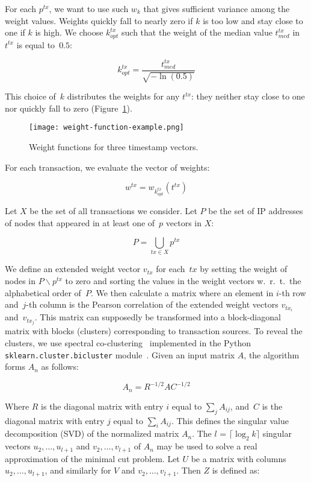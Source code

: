 For each $p^{tx}$, we want to use such $w_k$ that gives sufficient variance among the weight values.
Weights quickly fall to nearly zero if $k$ is too low and stay close to one if $k$ is high.
We choose $k^{tx}_{opt}$ such that the weight of the median value $t^{tx}_{med}$ in~$t^{tx}$ is equal to~$0.5$:

\[
k^{tx}_{opt} = \frac{t^{tx}_{med}}{\sqrt{-\ln(0.5)}}
\]

This choice of~$k$ distributes the weights for any $t^{tx}$: they neither stay close to one nor quickly fall to zero (Figure~\ref{fig:weight}).

\begin{figure}
	\centering
	\texttt{[image: weight-function-example.png]}
	\caption{Weight functions for three timestamp vectors.}
	\label{fig:weight}
\end{figure}
For each transaction, we evaluate the vector of weights:

\[
w^{tx} = w_{k^{tx}_{opt}}(t^{tx})
\]

Let $X$ be the set of all transactions we consider.
Let $P$ be the set of IP addresses of nodes that appeared in at least one of~$p$ vectors in $X$:

\[
P = \bigcup\limits_{tx \in X} p^{tx}
\]

We define an extended weight vector $v_{tx}$ for each~$tx$ by setting the weight of nodes in $P \backslash p^{tx}$ to zero and sorting the values in the weight vectors w.~r.~t.~the alphabetical order of~$P$.
We then calculate a matrix where an element in $i$-th row and~$j$-th column is the Pearson correlation of the extended weight vectors $v_{tx_i}$ and~$v_{tx_j}$.
This matrix can supposedly be transformed into a block-diagonal matrix with blocks (clusters) corresponding to transaction sources.
To reveal the clusters, we use spectral co-clustering~\cite{Dhillon2001} implemented in the Python \texttt{sklearn.cluster.bicluster} module~\cite{scikit-learn, scikitlearn2018}.
Given an input matrix $A$, the algorithm forms $A_n$ as follows:

\[
A_n = R^{-1/2}AC^{-1/2}
\]

Where $R$ is the diagonal matrix with entry $i$ equal to $\sum_{j} A_{ij}$, and~$C$ is the diagonal matrix with entry $j$ equal to $\sum_{i} A_{ij}$.
This defines the singular value decomposition (SVD) of the normalized matrix $A_n$.
The $l$ = $\lceil \log_2 k \rceil$ singular vectors $u_2,\dots,u_{l+1}$ and $v_2,\dots,v_{l+1}$ of $A_n$ may be used to solve a real approximation of the minimal cut problem.
Let $U$ be a matrix with columns $u_2,\dots,u_{l+1}$, and similarly for $V$ and $v_2,\dots,v_{l+1}$.
Then $Z$ is defined as:

